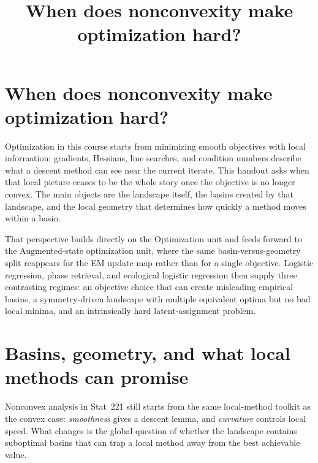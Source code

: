\documentclass[11pt]{article}
\title{When does nonconvexity make optimization hard?}
\author{}
\date{}
\begin{document}
\maketitle

\section[Nonconvexity and optimization hardness]{When does nonconvexity make optimization hard?}
\label{sec:convexity-opt-hardness-handout}

Optimization in this course starts from minimizing smooth objectives with local information: gradients, Hessians, line searches, and condition numbers describe what a descent method can see near the current iterate.
This handout asks when that local picture ceases to be the whole story once the objective is no longer convex.
The main objects are the landscape itself, the basins created by that landscape, and the local geometry that determines how quickly a method moves within a basin.

That perspective builds directly on the Optimization unit and feeds forward to the Augmented-state optimization unit, where the same basin-versus-geometry split reappears for the EM update map rather than for a single objective.
Logistic regression, phase retrieval, and ecological logistic regression then supply three contrasting regimes: an objective choice that can create misleading empirical basins, a symmetry-driven landscape with multiple equivalent optima but no bad local minima, and an intrinsically hard latent-assignment problem.

\section[Basins and geometry]{Basins, geometry, and what local methods can promise}
\label{sec:framing-nonconvex}

Nonconvex analysis in Stat~221 still starts from the same local-method toolkit as the convex case:
\emph{smoothness} gives a descent lemma, and \emph{curvature} controls local speed.
What changes is the global question of whether the landscape contains suboptimal basins that can trap a local method away from the best achievable value.
\end{document}
